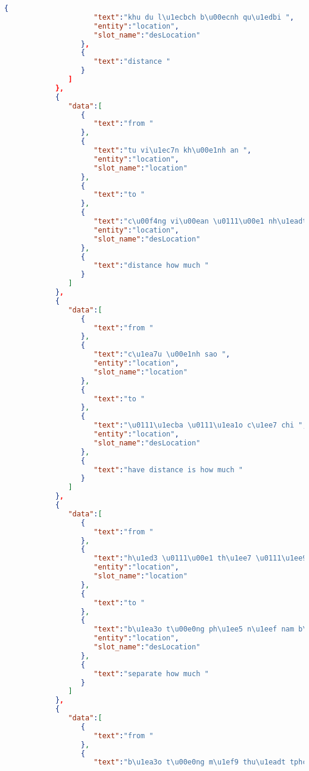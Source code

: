 \begin{lstlisting}[language=json,firstnumber=1]
                  {
                     "text":"khu du l\u1ecbch b\u00ecnh qu\u1edbi ",
                     "entity":"location",
                     "slot_name":"desLocation"
                  },
                  {
                     "text":"distance "
                  }
               ]
            },
            {
               "data":[
                  {
                     "text":"from "
                  },
                  {
                     "text":"tu vi\u1ec7n kh\u00e1nh an ",
                     "entity":"location",
                     "slot_name":"location"
                  },
                  {
                     "text":"to "
                  },
                  {
                     "text":"c\u00f4ng vi\u00ean \u0111\u00e1 nh\u1eadt rinrin park ",
                     "entity":"location",
                     "slot_name":"desLocation"
                  },
                  {
                     "text":"distance how much "
                  }
               ]
            },
            {
               "data":[
                  {
                     "text":"from "
                  },
                  {
                     "text":"c\u1ea7u \u00e1nh sao ",
                     "entity":"location",
                     "slot_name":"location"
                  },
                  {
                     "text":"to "
                  },
                  {
                     "text":"\u0111\u1ecba \u0111\u1ea1o c\u1ee7 chi ",
                     "entity":"location",
                     "slot_name":"desLocation"
                  },
                  {
                     "text":"have distance is how much "
                  }
               ]
            },
            {
               "data":[
                  {
                     "text":"from "
                  },
                  {
                     "text":"h\u1ed3 \u0111\u00e1 th\u1ee7 \u0111\u1ee9c ",
                     "entity":"location",
                     "slot_name":"location"
                  },
                  {
                     "text":"to "
                  },
                  {
                     "text":"b\u1ea3o t\u00e0ng ph\u1ee5 n\u1eef nam b\u1ed9 ",
                     "entity":"location",
                     "slot_name":"desLocation"
                  },
                  {
                     "text":"separate how much "
                  }
               ]
            },
            {
               "data":[
                  {
                     "text":"from "
                  },
                  {
                     "text":"b\u1ea3o t\u00e0ng m\u1ef9 thu\u1eadt tphcm ",

\end{lstlisting}

